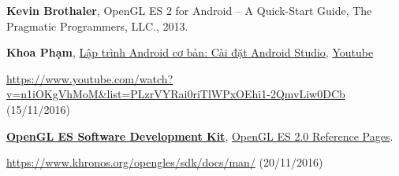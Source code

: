 \documentclass[13pt,a4paper]{extreport}
\begin{document}
\begin{enumerate}[{[1]}]
		\item \textbf{Kevin Brothaler}, OpenGL ES 2 for Android -- A Quick-Start Guide, The Pragmatic Programmers, LLC., 2013.		
		
		\item \textbf{Khoa Phạm}, \href{https://www.youtube.com/watch?v=n1iOKgVhMoM&list=PLzrVYRai0riTlWPxOEhi1-2QmvLiw0DCb}{Lập trình Android cơ bản: Cài đặt Android Studio}, \href{https://www.youtube.com}{Youtube}
		
		\href{https://www.youtube.com/watch?v=n1iOKgVhMoM&list=PLzrVYRai0riTlWPxOEhi1-2QmvLiw0DCb}{https://www.youtube.com/watch?v=n1iOKgVhMoM\&list=PLzrVYRai0riTlWPxOEhi1-2QmvLiw0DCb} (15/11/2016)			

		\item \href{https://www.khronos.org/opengles/sdk/}{\textbf{OpenGL ES Software Development Kit}}, \href{https://www.khronos.org/opengles/sdk/docs/man/}{OpenGL ES 2.0 Reference Pages}.
		
		\href{https://www.khronos.org/opengles/sdk/docs/man/}{https://www.khronos.org/opengles/sdk/docs/man/} (20/11/2016)
							
	\end{enumerate}
\end{document}
